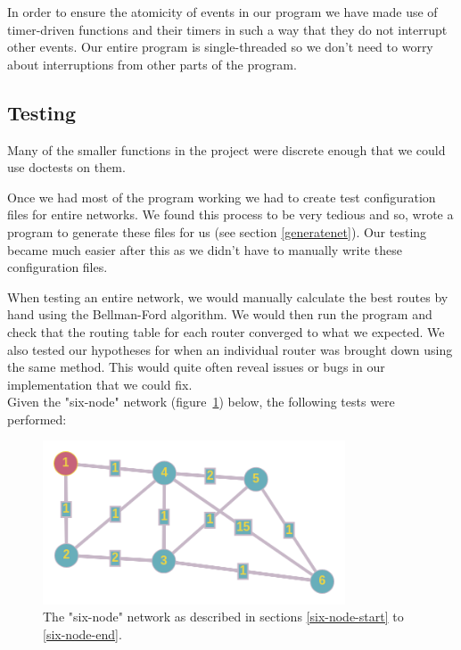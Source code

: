 \documentclass[11pt]{article} %
\begin{document}
In order to ensure the atomicity of events in our program we have made use of timer-driven functions and their timers in such a way that they do not  interrupt other events. Our entire program is single-threaded so we don't need to worry about interruptions from other parts of the program.


\subsection{Testing} \label{testing}

Many of the smaller functions in the project were discrete enough that we could use doctests on them.

Once we had most of the program working we had to create test configuration files for entire networks. We found this process to be very tedious and so, wrote a program to generate these files for us (see section \ref{generatenet}). Our testing became much easier after this as we didn't have to manually write these configuration files.

When testing an entire network, we would manually calculate the best routes by hand using the Bellman-Ford algorithm. We would then run the program and check that the routing table for each router converged to what we expected. We also tested our hypotheses for when an individual router was brought down using the same method. This would quite often reveal issues or bugs in our implementation that we could fix.\\

\noindent Given the "six-node" network (figure\ \ref{fig:sixnode}) below, the following tests were performed:

\begin{figure}[H]
	\centering
	\includegraphics[width=0.8\textwidth]{includes/images/six-node}
	\caption{The "six-node" network as described in sections \ref{six-node-start} to \ref{six-node-end}.}
	\label{fig:sixnode}
\end{figure}
\end{document}

